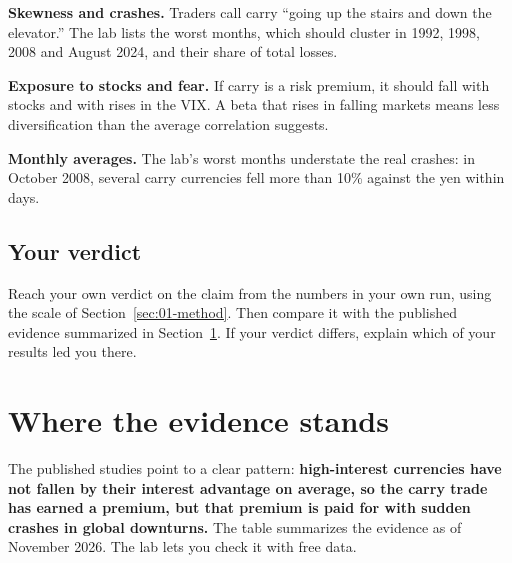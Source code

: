\textbf{Skewness and crashes.} Traders call carry ``going up the stairs and down the elevator.'' The lab lists the worst months, which should cluster in 1992, 1998, 2008 and August 2024, and their share of total losses.

\textbf{Exposure to stocks and fear.} If carry is a risk premium, it should fall with stocks and with rises in the VIX. A beta that rises in falling markets means less diversification than the average correlation suggests.

\textbf{Monthly averages.} The lab's worst months understate the real crashes: in October 2008, several carry currencies fell more than 10\% against the yen within days.

\subsection*{Your verdict}

Reach your own verdict on the claim from the numbers in your own run, using the scale of Section~\ref{sec:01-method}. Then compare it with the published evidence summarized in Section~\ref{sec:06-verdict}. If your verdict differs, explain which of your results led you there.

\section{Where the evidence stands}
\label{sec:06-verdict}

The published studies point to a clear pattern: \textbf{high-interest currencies have not fallen by their interest advantage on average, so the carry trade has earned a premium, but that premium is paid for with sudden crashes in global downturns.} The table summarizes the evidence as of November 2026. The lab lets you check it with free data.

